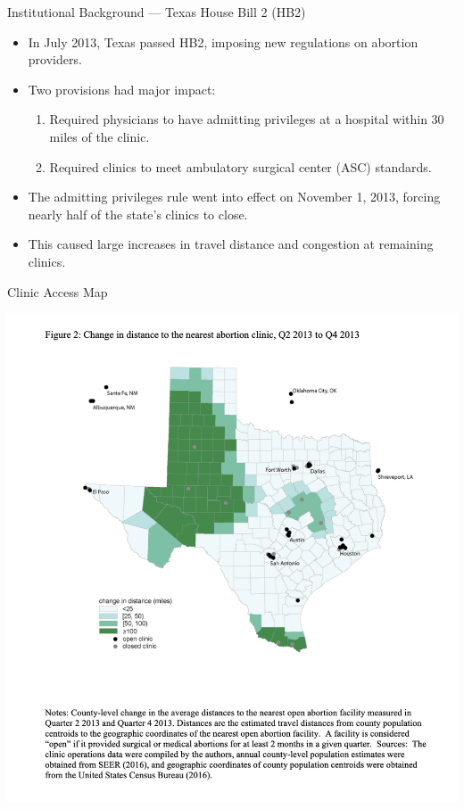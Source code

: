 \documentclass{beamer}
\begin{document}
\begin{frame}{Institutional Background — Texas House Bill 2 (HB2)}

\begin{itemize}
\item In July 2013, Texas passed HB2, imposing new regulations on abortion providers.
\item Two provisions had major impact:
	\begin{enumerate}
	\item Required physicians to have admitting privileges at a hospital within 30 miles of the clinic.
	\item Required clinics to meet ambulatory surgical center (ASC) standards.
	\end{enumerate}
\item The admitting privileges rule went into effect on November 1, 2013, forcing nearly half of the state’s clinics to close.
\item This caused large increases in travel distance and congestion at remaining clinics.
\end{itemize}

\end{frame}


\begin{frame}{Clinic Access Map}

\begin{center}
  \includegraphics[width=0.9\linewidth]{./lecture_includes/abortion_map.png}
\end{center}

\end{frame}
\end{document}
